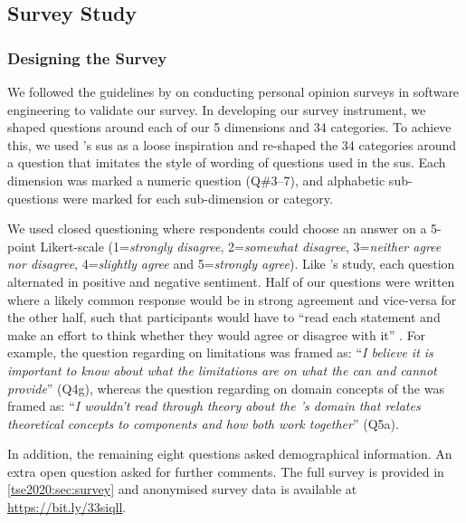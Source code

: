 \subsection{Survey Study}
\label{tse2020:sec:validation:survey}

\subsubsection{Designing the Survey}

We followed the guidelines by \citet{Kitchenham:2007ux} on conducting personal opinion surveys in software engineering to validate our survey. In developing our survey instrument, we  shaped questions around each of our 5 dimensions and 34 categories. To achieve this, we used \citeauthor{Brooke:1996ua}'s \gls{sus} \citep{Brooke:1996ua} as a loose inspiration and re-shaped the 34 categories around a question that imitates the style of wording of questions used in the \gls{sus}. Each dimension was marked a numeric question (Q\#3--7), and alphabetic sub-questions were marked for each sub-dimension or category.

We used closed questioning where respondents could choose an answer on a 5-point Likert-scale (1=\textit{strongly disagree}, 2=\textit{somewhat disagree}, 3=\textit{neither agree nor disagree}, 4=\textit{slightly agree} and 5=\textit{strongly agree}).  Like \citeauthor{Brooke:1996ua}'s study, each question alternated in positive and negative sentiment. Half of our questions were written where a likely common response would be in strong agreement and vice-versa for the other half, such that participants would have to ``read each statement and make an effort to think whether they would agree or disagree with it'' \citep{Brooke:1996ua}. For example, the question regarding  on  limitations was framed as: ``\textit{I believe it is important to know about what the limitations are on what the  can and cannot provide}'' (Q4g), whereas the question regarding  on domain concepts of the  was framed as: ``\textit{I wouldn't read through theory about the 's domain that relates theoretical concepts to  components and how both work together}'' (Q5a).

In addition, the remaining eight questions asked demographical information. An extra open question asked for further comments. The full survey is provided in \cref{tse2020:sec:survey} and anonymised survey data is available at \mbox{\url{https://bit.ly/33siqll}}.

